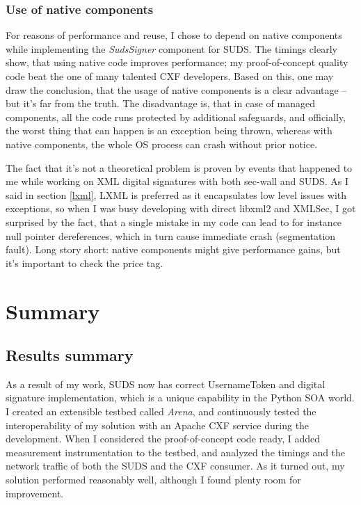 \subsection{Use of native components}

For reasons of performance and reuse, I chose to depend on native components while implementing the \emph{SudsSigner} component for SUDS. The timings clearly show, that using native code improves performance; my proof-of-concept quality code beat the one of many talented CXF developers. Based on this, one may draw the conclusion, that the usage of native components is a clear advantage -- but it's far from the truth. The disadvantage is, that in case of managed components, all the code runs protected by additional safeguards, and officially, the worst thing that can happen is an exception being thrown, whereas with native components, the whole OS process can crash without prior notice.

The fact that it's not a theoretical problem is proven by events that happened to me while working on XML digital signatures with both sec-wall and SUDS. As I said in section \ref{lxml}, LXML is preferred as it encapsulates low level issues with exceptions, so when I was busy developing with direct libxml2 and XMLSec, I got surprised by the fact, that a single mistake in my code can lead to for instance null pointer dereferences, which in turn cause immediate crash (segmentation fault). Long story short: native components might give performance gains, but it's important to check the price tag.

\chapter{Summary}

\section{Results summary}

As a result of my work, SUDS now has correct UsernameToken and digital signature implementation, which is a unique capability in the Python SOA world. I created an extensible testbed called \emph{Arena}, and continuously tested the interoperability of my solution with an Apache CXF service during the development. When I considered the proof-of-concept code ready, I added measurement instrumentation to the testbed, and analyzed the timings and the network traffic of both the SUDS and the CXF consumer. As it turned out, my solution performed reasonably well, although I found plenty room for improvement.

